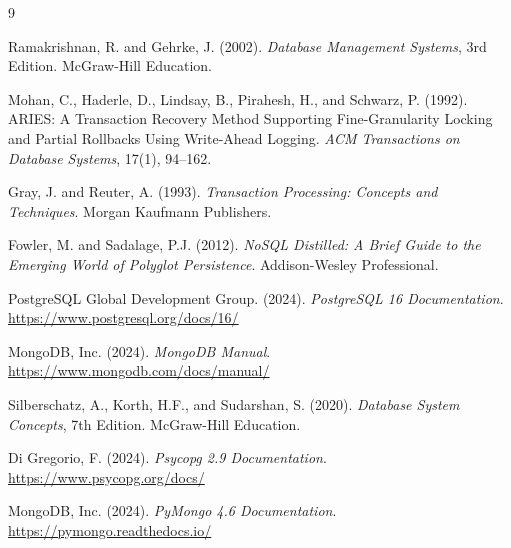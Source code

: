 \begin{thebibliography}{9}

  Ramakrishnan, R. and Gehrke, J. (2002).
  \textit{Database Management Systems}, 3rd Edition.
  McGraw-Hill Education.

  Mohan, C., Haderle, D., Lindsay, B., Pirahesh, H., and Schwarz, P. (1992).
  ARIES: A Transaction Recovery Method Supporting Fine-Granularity Locking
  and Partial Rollbacks Using Write-Ahead Logging.
  \textit{ACM Transactions on Database Systems}, 17(1), 94--162.

  Gray, J. and Reuter, A. (1993).
  \textit{Transaction Processing: Concepts and Techniques}.
  Morgan Kaufmann Publishers.

  Fowler, M. and Sadalage, P.J. (2012).
  \textit{NoSQL Distilled: A Brief Guide to the Emerging World of
  Polyglot Persistence}.
  Addison-Wesley Professional.

  PostgreSQL Global Development Group. (2024).
  \textit{PostgreSQL 16 Documentation}.
  \url{https://www.postgresql.org/docs/16/}

  MongoDB, Inc. (2024).
  \textit{MongoDB Manual}.
  \url{https://www.mongodb.com/docs/manual/}

  Silberschatz, A., Korth, H.F., and Sudarshan, S. (2020).
  \textit{Database System Concepts}, 7th Edition.
  McGraw-Hill Education.

  Di Gregorio, F. (2024).
  \textit{Psycopg 2.9 Documentation}.
  \url{https://www.psycopg.org/docs/}

  MongoDB, Inc. (2024).
  \textit{PyMongo 4.6 Documentation}.
  \url{https://pymongo.readthedocs.io/}

\end{thebibliography}
